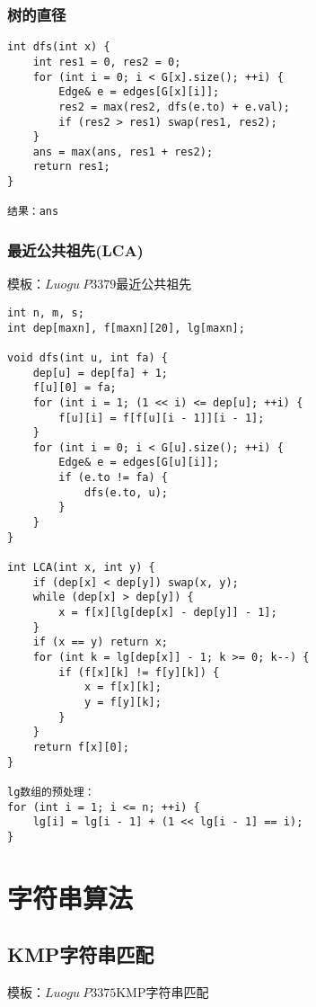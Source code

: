 \documentclass[UTF8]{ctexart}
\begin{document}
\subsubsection{树的直径}

\begin{lstlisting}
int dfs(int x) {
    int res1 = 0, res2 = 0;
    for (int i = 0; i < G[x].size(); ++i) {
        Edge& e = edges[G[x][i]];
        res2 = max(res2, dfs(e.to) + e.val);
        if (res2 > res1) swap(res1, res2);
    }
    ans = max(ans, res1 + res2);
    return res1;
}

结果：ans
\end{lstlisting}

\subsubsection{最近公共祖先(LCA)}

模板：$Luogu\ P3379$最近公共祖先

\begin{lstlisting}
int n, m, s;
int dep[maxn], f[maxn][20], lg[maxn];

void dfs(int u, int fa) {
    dep[u] = dep[fa] + 1;
    f[u][0] = fa;
    for (int i = 1; (1 << i) <= dep[u]; ++i) {
        f[u][i] = f[f[u][i - 1]][i - 1];
    }
    for (int i = 0; i < G[u].size(); ++i) {
        Edge& e = edges[G[u][i]];
        if (e.to != fa) {
            dfs(e.to, u);
        }
    }
}

int LCA(int x, int y) {
    if (dep[x] < dep[y]) swap(x, y);
    while (dep[x] > dep[y]) {
        x = f[x][lg[dep[x] - dep[y]] - 1];
    }
    if (x == y) return x;
    for (int k = lg[dep[x]] - 1; k >= 0; k--) {
        if (f[x][k] != f[y][k]) {
            x = f[x][k];
            y = f[y][k];
        }
    }
    return f[x][0];
}

lg数组的预处理：
for (int i = 1; i <= n; ++i) {
    lg[i] = lg[i - 1] + (1 << lg[i - 1] == i);
}
\end{lstlisting}

\section{字符串算法}

\subsection{KMP字符串匹配}

模板：$Luogu\ P3375$KMP字符串匹配
\end{document}
